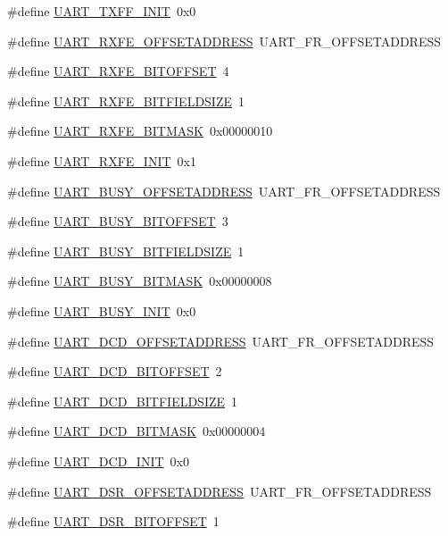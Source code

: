 \begin{DoxyCompactItemize}
\#define \hyperlink{a00575_a421fd313f7b40b4cba7b66ce1b3ddd7b}{UART\_\-TXFF\_\-INIT}~0x0
\item 
\#define \hyperlink{a00575_a1bc687513243386539793aa81feb860c}{UART\_\-RXFE\_\-OFFSETADDRESS}~UART\_\-FR\_\-OFFSETADDRESS
\item 
\#define \hyperlink{a00575_a28bb0df169b29bb34e1cf3ed853a219a}{UART\_\-RXFE\_\-BITOFFSET}~4
\item 
\#define \hyperlink{a00575_aff918a769f7010e187149aa09682df84}{UART\_\-RXFE\_\-BITFIELDSIZE}~1
\item 
\#define \hyperlink{a00575_afb19501bb45aec652e78c1b8ef80819b}{UART\_\-RXFE\_\-BITMASK}~0x00000010
\item 
\#define \hyperlink{a00575_aa085ad32f2d75e162339e99256a79d8f}{UART\_\-RXFE\_\-INIT}~0x1
\item 
\#define \hyperlink{a00575_adab381e51e943b8e0bccef69a189b426}{UART\_\-BUSY\_\-OFFSETADDRESS}~UART\_\-FR\_\-OFFSETADDRESS
\item 
\#define \hyperlink{a00575_a17a3e776ac3be19463d1f6769972f557}{UART\_\-BUSY\_\-BITOFFSET}~3
\item 
\#define \hyperlink{a00575_af1ce2e82d940bdd21646d4e191b8a5a7}{UART\_\-BUSY\_\-BITFIELDSIZE}~1
\item 
\#define \hyperlink{a00575_aaea49c4dc91614cdcb658f09c62aa2ea}{UART\_\-BUSY\_\-BITMASK}~0x00000008
\item 
\#define \hyperlink{a00575_adee72654e24d4a24a72880814744f052}{UART\_\-BUSY\_\-INIT}~0x0
\item 
\#define \hyperlink{a00575_a1e51598e084d41ae1bfd22e01b5c4aa1}{UART\_\-DCD\_\-OFFSETADDRESS}~UART\_\-FR\_\-OFFSETADDRESS
\item 
\#define \hyperlink{a00575_a2ec1b6b1b8b3b500d3bc00d5979b7ea3}{UART\_\-DCD\_\-BITOFFSET}~2
\item 
\#define \hyperlink{a00575_adbc5d843846c01d1321d2446f98979ed}{UART\_\-DCD\_\-BITFIELDSIZE}~1
\item 
\#define \hyperlink{a00575_a26dbf2f99dcdbc3087788fd7bb43714b}{UART\_\-DCD\_\-BITMASK}~0x00000004
\item 
\#define \hyperlink{a00575_a23780bc30c1059bfffd1ce89d61ad0ff}{UART\_\-DCD\_\-INIT}~0x0
\item 
\#define \hyperlink{a00575_ac301e851aed39ac511a61a236fca484e}{UART\_\-DSR\_\-OFFSETADDRESS}~UART\_\-FR\_\-OFFSETADDRESS
\item 
\#define \hyperlink{a00575_a4fee9e385ead474e3f5753fea4b20188}{UART\_\-DSR\_\-BITOFFSET}~1
\item 

\end{DoxyCompactItemize}
